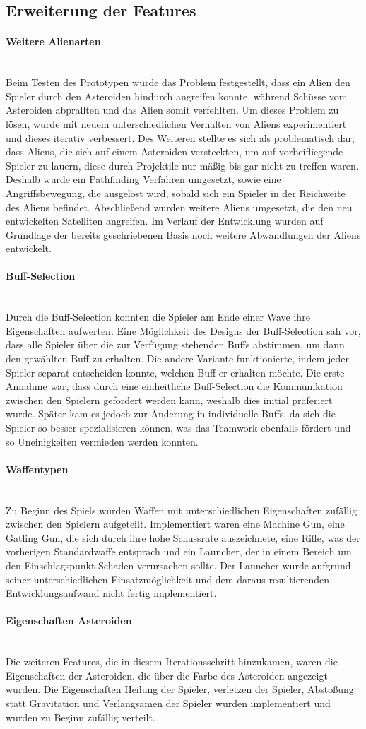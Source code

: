 \documentclass[11pt]{scrartcl}
\newcommand{\lbparagraph}[1]{\paragraph*{#1}\mbox{}\\}
\begin{document}
\subsection{Erweiterung der Features}
\lbparagraph{Weitere Alienarten}
Beim Testen des Prototypen wurde das Problem festgestellt, dass ein Alien den Spieler durch den Asteroiden hindurch angreifen konnte, während Schüsse vom Asteroiden abprallten und das Alien somit verfehlten. Um dieses Problem zu lösen, wurde mit neuem unterschiedlichen Verhalten von Aliens experimentiert und dieses iterativ verbessert.
Des Weiteren stellte es sich als problematisch dar, dass Aliens, die sich auf einem Asteroiden versteckten, um auf vorbeifliegende Spieler zu lauern, diese durch Projektile nur mäßig bis gar nicht zu treffen waren. Deshalb wurde ein Pathfinding Verfahren umgesetzt, sowie eine Angriffsbewegung, die ausgelöst wird, sobald sich ein Spieler in der Reichweite des Aliens befindet. Abschließend wurden weitere Aliens umgesetzt, die den neu entwickelten Satelliten angreifen. Im Verlauf der Entwicklung wurden auf Grundlage der bereits geschriebenen Basis noch weitere Abwandlungen der Aliens entwickelt.

\lbparagraph{Buff-Selection}
Durch die Buff-Selection konnten die Spieler am Ende einer Wave ihre Eigenschaften aufwerten. Eine Möglichkeit des Designs der Buff-Selection sah vor, dass alle Spieler über die zur Verfügung stehenden Buffs abstimmen, um dann den gewählten Buff zu erhalten. Die andere Variante funktionierte, indem jeder Spieler separat entscheiden konnte, welchen Buff er erhalten möchte. Die erste Annahme war, dass durch eine einheitliche Buff-Selection die Kommunikation zwischen den Spielern gefördert werden kann, weshalb dies initial präferiert wurde.
Später kam es jedoch zur Änderung in individuelle Buffs, da sich die Spieler so besser spezialisieren können, was das Teamwork ebenfalls fördert und so Uneinigkeiten vermieden werden konnten.

\lbparagraph{Waffentypen}
Zu Beginn des Spiels wurden Waffen mit unterschiedlichen Eigenschaften zufällig zwischen den Spielern aufgeteilt. Implementiert waren eine Machine Gun, eine Gatling Gun, die sich durch ihre hohe Schussrate auszeichnete, eine Rifle, was der vorherigen Standardwaffe entsprach und ein Launcher, der in einem Bereich um den Einschlagspunkt Schaden verursachen sollte. Der Launcher wurde aufgrund seiner unterschiedlichen Einsatzmöglichkeit und dem daraus resultierenden Entwicklungsaufwand nicht fertig implementiert.

\lbparagraph{Eigenschaften Asteroiden}
Die weiteren Features, die in diesem Iterationsschritt hinzukamen, waren die Eigenschaften der Asteroiden, die über die Farbe des Asteroiden angezeigt wurden. Die Eigenschaften Heilung der Spieler, verletzen der Spieler, Abstoßung statt Gravitation und Verlangsamen der Spieler wurden implementiert und wurden zu Beginn zufällig verteilt.
\end{document}
